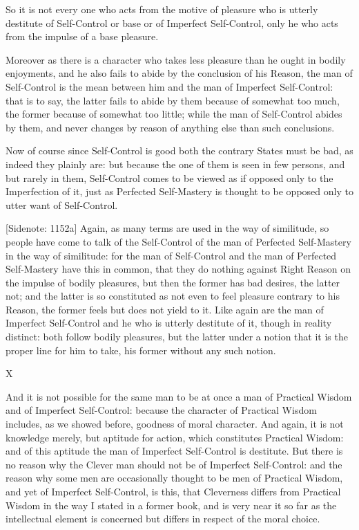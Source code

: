 So it is not every one who acts from the motive of pleasure who is
utterly destitute of Self-Control or base or of Imperfect Self-Control,
only he who acts from the impulse of a base pleasure.

Moreover as there is a character who takes less pleasure than he ought
in bodily enjoyments, and he also fails to abide by the conclusion of
his Reason, the man of Self-Control is the mean between him and the man
of Imperfect Self-Control: that is to say, the latter fails to abide by
them because of somewhat too much, the former because of somewhat too
little; while the man of Self-Control abides by them, and never changes
by reason of anything else than such conclusions.

Now of course since Self-Control is good both the contrary States must
be bad, as indeed they plainly are: but because the one of them is seen
in few persons, and but rarely in them, Self-Control comes to be
viewed as if opposed only to the Imperfection of it, just as
Perfected Self-Mastery is thought to be opposed only to utter want of
Self-Control.

[Sidenote: 1152a] Again, as many terms are used in the way of
similitude, so people have come to talk of the Self-Control of the man
of Perfected Self-Mastery in the way of similitude: for the man of
Self-Control and the man of Perfected Self-Mastery have this in common,
that they do nothing against Right Reason on the impulse of bodily
pleasures, but then the former has bad desires, the latter not; and the
latter is so constituted as not even to feel pleasure contrary to his
Reason, the former feels but does not yield to it. Like again are the
man of Imperfect Self-Control and he who is utterly destitute of it,
though in reality distinct: both follow bodily pleasures, but the latter
under a notion that it is the proper line for him to take, his former
without any such notion.



X

And it is not possible for the same man to be at once a man of Practical
Wisdom and of Imperfect Self-Control: because the character of Practical
Wisdom includes, as we showed before, goodness of moral character.
And again, it is not knowledge merely, but aptitude for action, which
constitutes Practical Wisdom: and of this aptitude the man of Imperfect
Self-Control is destitute. But there is no reason why the Clever man
should not be of Imperfect Self-Control: and the reason why some men are
occasionally thought to be men of Practical Wisdom, and yet of Imperfect
Self-Control, is this, that Cleverness differs from Practical Wisdom in
the way I stated in a former book, and is very near it so far as the
intellectual element is concerned but differs in respect of the moral
choice.

